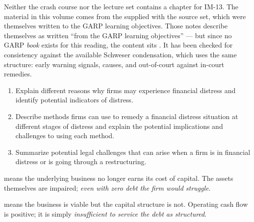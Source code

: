 

\begin{imtrapbox}[breakable=false,title={A reading with no chapter in either layer}]
Neither the crash course nor the lecture set contains a chapter for IM-13. The
material in this volume comes from the  supplied with the
source set, which were themselves written to the GARP learning objectives. Those
notes describe themselves as written ``from the GARP learning objectives'' --- but
since no GARP \emph{book} exists for this reading, the content sits . It has been checked for consistency against the available
Schweser condensation, which uses the same structure: early warning signals,
causes, and out-of-court against in-court remedies.
\end{imtrapbox}

\begin{imkeybox}[title={The three objectives in this reading}]
\begin{enumerate}[label=\textbf{\alph*.}]
\item Explain different reasons why firms may experience financial distress and identify potential indicators of distress.
\item Describe methods firms can use to remedy a financial distress situation at different stages of distress and explain the potential implications and challenges to using each method.
\item Summarize potential legal challenges that can arise when a firm is in financial distress or is going through a restructuring.
\end{enumerate}
\end{imkeybox}


\begin{imdefbox}[title={The distinction that drives everything else}]
 means the underlying business no longer earns its cost of
capital. The assets themselves are impaired; \emph{even with zero debt the firm
would struggle}.

\smallskip
{} means the business is viable but the capital structure
is not. Operating cash flow is positive; it is simply \emph{insufficient to
service the debt as structured}.
\end{imdefbox}

